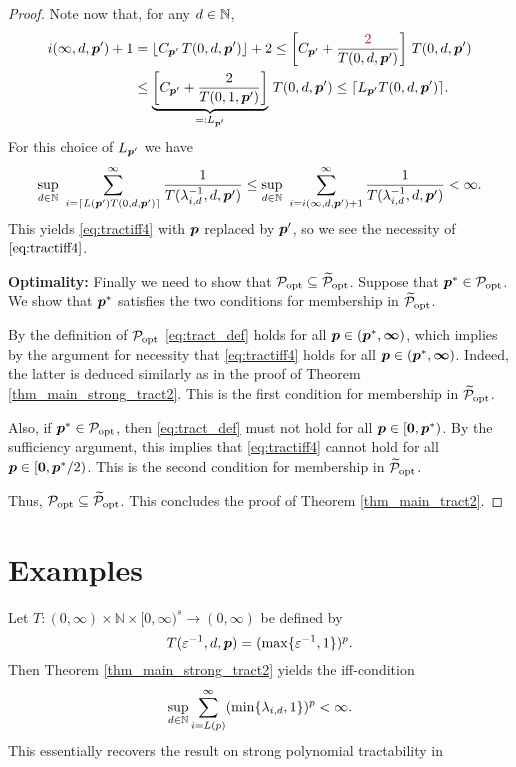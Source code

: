 \documentclass[11pt,a4paper]{article}
\newcommand{\peter}[1]{\begingroup\color{purple}#1\endgroup}
\begin{document}
\begin{proof}
Note now that, for any $d\in\mathbb{N}$,
\begin{align*}
 i(\infty,d,\vp') +1  & = \lfloor C_{\vp'}\, T(0,d,\vp')\rfloor +2 \le  \left[C_{\vp'} + \frac{\peter{2}}{T(0,d,\vp')}   \right]\, T(0,d,\vp')\\
 & \le  \underbrace{\left[C_{\vp'} + \frac{2}{T(0,1,\vp')}   \right]}_{=:L_{\vp'}}\, T(0,d,\vp')
 \le \lceil L_{\vp'} T(0,d,\vp')\rceil .
\end{align*}
For this choice of $L_{\boldsymbol{p}'}$ we have
\[
\sup_{d\in\mathbb{N}}\,\, \sum_{i=\lceil L(\boldsymbol{p}') T(0,d,\boldsymbol{p}')\rceil}^\infty \frac{1}{T(\lambda_{i,d}^{-1},d, \boldsymbol{p}')}
\le
\sup_{d\in\mathbb{N}} \, \, \sum_{i=i (\infty,d,\boldsymbol{p}')+1}^\infty \frac{1}{T (\lambda_{i,d}^{-1},d,\boldsymbol{p}')} <
\infty.
\]
This yields \eqref{eq:tractiff4} with $\boldsymbol{p}$ replaced by $\boldsymbol{p}'$, so we see the necessity of $\eqref{eq:tractiff4}$.

\bigskip

\noindent \textbf{Optimality:}
Finally we need to show that $\mathcal{P}_{\textup{opt}} \subseteq \widetilde{\mathcal{P}}_{\textup{opt}}$.  Suppose that  $\boldsymbol{p}^* \in \mathcal{P}_{\textup{opt}}$.  We show that $\boldsymbol{p}^*$ satisfies the two conditions for membership in $\widetilde{\mathcal{P}}_{\textup{opt}}$.

By the definition of  $\mathcal{P}_{\textup{opt}}$ \eqref{eq:tract_def}  holds for all $\boldsymbol{p} \in (\boldsymbol{p}^*,\boldsymbol{\infty})$, which implies by the argument for necessity that  \eqref{eq:tractiff4} holds for all $\boldsymbol{p} \in (\boldsymbol{p}^*,\boldsymbol{\infty})$.  \peter{Indeed, the latter is deduced similarly as in the proof of Theorem \ref{thm_main_strong_tract2}.}
This is the first condition for membership in $\widetilde{\mathcal{P}}_{\textup{opt}}$.

Also, if  $\boldsymbol{p}^* \in \mathcal{P}_{\textup{opt}}$, then \eqref{eq:tract_def} must not hold for all $\boldsymbol{p} \in [\boldsymbol{0}, \boldsymbol{p}^*)$.  By the sufficiency argument, this implies that \eqref{eq:tractiff4} cannot hold for all $\boldsymbol{p} \in [\boldsymbol{0},\boldsymbol{p}^*/2)$.  This is the second condition for membership in $\widetilde{\mathcal{P}}_{\textup{opt}}$.

Thus,  $\mathcal{P}_{\textup{opt}} \subseteq \widetilde{\mathcal{P}}_{\textup{opt}}$.  This concludes the proof of Theorem \ref{thm_main_tract2}.

\end{proof}


\section{Examples} \label{sec:examples}

\begin{example}

Let $ T :(0,\infty) \times \mathbb{N} \times [0,\infty)^s \rightarrow (0,\infty)$
be defined by
\[
 T(\varepsilon^{-1},d,\boldsymbol{p})= (\max\{\varepsilon^{-1},1\})^p .
\]
Then Theorem \ref{thm_main_strong_tract2} yields the iff-condition
\[
 \sup_{d\in\mathbb{N}} \sum_{i=L(p)}^\infty (\min\{\lambda_{i,d},1\})^p < \infty.
\]
This essentially recovers the result on strong polynomial tractability in \cite[Theorem 5.1]{NW08}
\end{example}
\end{document}
